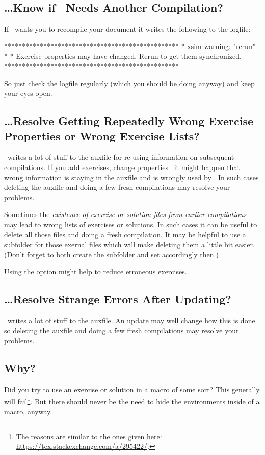 \documentclass{xsim-manual}
\begin{document}
\subsection{\dots Know if \xsim\ Needs Another Compilation?}
If \xsim\ wants you to recompile your document it writes the following to the
logfile:
\begin{sourcecode}
  *************************************************
  * xsim warning: "rerun"
  * 
  * Exercise properties may have changed. Rerun to get them synchronized.
  *************************************************
\end{sourcecode}
So just check the logfile regularly (which you should be doing anyway) and
keep your eyes open.

\subsection{\dots Resolve Getting Repeatedly Wrong Exercise Properties or
  Wrong Exercise Lists?}\label{sec:resolve-getting}
\xsim\ writes a lot of stuff to the auxfile for re-using information on
subsequent compilations.  If you add exercises, change properties \etc\ it
might happen that wrong information is staying in the auxfile and is wrongly
used by \xsim.  In such cases deleting the auxfile and doing a few fresh
compilations may resolve your problems.

Sometimes the \emph{existence of exercise or solution files from earlier
  compilations} may lead to wrong lists of exercises or solutions.  In such
cases it can be useful to delete all those files and doing a fresh
compilation.  It may be helpful to use a subfolder for those exernal files
which will make deleting them a little bit easier. (Don't forget to both
create the subfolder and set  accordingly then.)

Using the  option might help to reduce erroneous exercises.

\subsection{\dots Resolve Strange Errors After Updating?}
\xsim\ writes a lot of stuff to the auxfile.  An update may well change how
this is done so deleting the auxfile and doing a few fresh compilations may
resolve your problems.

\subsection{
  Why?}
Did you try to use an exercise or solution in a macro of some sort?  This
generally will fail\footnote{The reasons are similar to the ones given here:
  \url{https://tex.stackexchange.com/a/295422/}.}.  But there should never be
the need to hide the environments inside of a macro, anyway.
\end{document}
